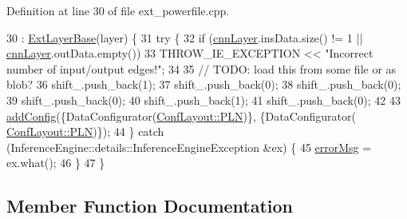 Definition at line 30 of file ext\+\_\+powerfile.\+cpp.


\begin{DoxyCode}
30                                                  : \hyperlink{classInferenceEngine_1_1Extensions_1_1Cpu_1_1ExtLayerBase_affff0e8263ca26852ccf71d299d7b06a}{ExtLayerBase}(layer) \{
31         \textcolor{keywordflow}{try} \{
32             \textcolor{keywordflow}{if} (\hyperlink{classInferenceEngine_1_1Extensions_1_1Cpu_1_1ExtLayerBase_a1074cdccacb9e9ca6eec01bbc2f7ca4a}{cnnLayer}.insData.size() != 1 || \hyperlink{classInferenceEngine_1_1Extensions_1_1Cpu_1_1ExtLayerBase_a1074cdccacb9e9ca6eec01bbc2f7ca4a}{cnnLayer}.outData.empty())
33                 THROW\_IE\_EXCEPTION << \textcolor{stringliteral}{"Incorrect number of input/output edges!"};
34 
35             \textcolor{comment}{// TODO: load this from some file or as blob?}
36             shift\_.push\_back(1);
37             shift\_.push\_back(0);
38             shift\_.push\_back(0);
39             shift\_.push\_back(0);
40             shift\_.push\_back(1);
41             shift\_.push\_back(0);
42 
43             \hyperlink{classInferenceEngine_1_1Extensions_1_1Cpu_1_1ExtLayerBase_a0ac7a6632e95b9500d5246b05b4b0bfa}{addConfig}(\{DataConfigurator(\hyperlink{classInferenceEngine_1_1Extensions_1_1Cpu_1_1ExtLayerBase_a1258a8d209e0249e0b1717618352ddfba446687ea2db1ada75be5ed053be77f59}{ConfLayout::PLN})\}, \{DataConfigurator(
      \hyperlink{classInferenceEngine_1_1Extensions_1_1Cpu_1_1ExtLayerBase_a1258a8d209e0249e0b1717618352ddfba446687ea2db1ada75be5ed053be77f59}{ConfLayout::PLN})\});
44         \} \textcolor{keywordflow}{catch} (InferenceEngine::details::InferenceEngineException &ex) \{
45             \hyperlink{classInferenceEngine_1_1Extensions_1_1Cpu_1_1ExtLayerBase_abc78e9b5a79fa339ffd831a5318f71f7}{errorMsg} = ex.what();
46         \}
47     \}
\end{DoxyCode}


\subsection{Member Function Documentation}
